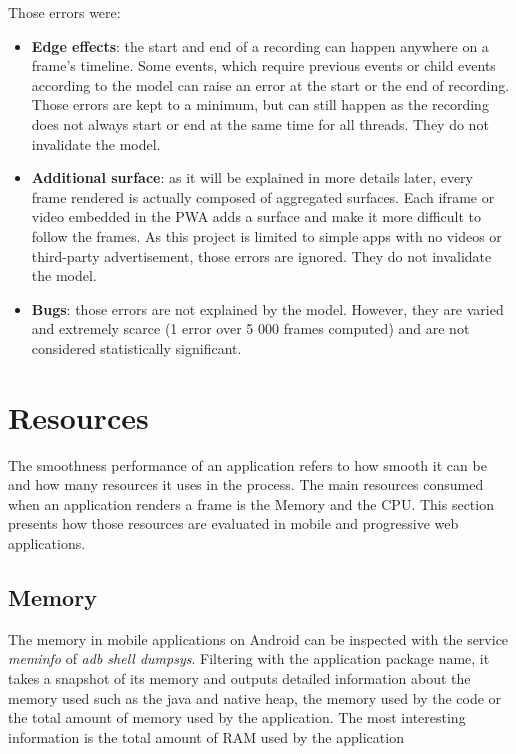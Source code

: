 \documentclass{kththesis}
\begin{document}
    Those errors were:
    \begin{itemize}
        \item \textbf{Edge effects}: the start and end of a recording can happen anywhere on a frame's timeline. Some events, which require previous events or child events according to the model can raise an error at the start or the end of recording. Those errors are kept to a minimum, but can still happen as the recording does not always start or end at the same time for all threads. They do not invalidate the model.
        \item \textbf{Additional surface}: as it will be explained in more details later, every frame rendered is actually composed of aggregated surfaces. Each iframe or video embedded in the PWA adds a surface and make it more difficult to follow the frames. As this project is limited to simple apps with no videos or third-party advertisement, those errors are ignored. They do not invalidate the model.
        \item \textbf{Bugs}: those errors are not explained by the model. However, they are varied and extremely scarce (1 error over 5 000 frames computed) and are not considered statistically significant.
    \end{itemize}

\section{Resources}

The smoothness performance of an application refers to how smooth it can be and how many resources it uses in the process. The main resources consumed when an application renders a frame is the Memory and the CPU. This section presents how those resources are evaluated in mobile and progressive web applications.     

\subsection{Memory}
The memory in mobile applications on Android can be inspected with the service \textit{meminfo} of \textit{adb shell dumpsys}. Filtering with the application package name, it takes a snapshot of its memory and outputs detailed information about the memory used such as the java and native heap, the memory used by the code or the total amount of memory used by the application. The most interesting information is the total amount of RAM used by the application
\end{document}
